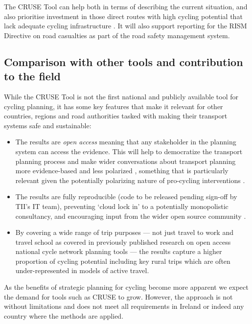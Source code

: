 \documentclass[
  super,
  preprint,
  3p]{elsarticle}
\providecommand{\tightlist}{%
  \setlength{\itemsep}{0pt}\setlength{\parskip}{0pt}}\usepackage{longtable,booktabs,array}
\begin{document}
The CRUSE Tool can help both in terms of describing the current
situation, and also prioritise investment in those direct routes with
high cycling potential that lack adequate cycling infrastructure
\citep{caulfield2012}. It will also support reporting for the RISM
Directive on road casualties as part of the road safety management
system.

\subsection{Comparison with other tools and contribution to the
field}\label{comparison-with-other-tools-and-contribution-to-the-field}

While the CRUSE Tool is not the first national and publicly available
tool for cycling planning, it has some key features that make it
relevant for other countries, regions and road authorities tasked with
making their transport systems safe and sustainable:

\begin{itemize}
\tightlist
\item
  The results are \emph{open access} meaning that any stakeholder in the
  planning system can access the evidence. This will help to democratize
  the transport planning process and make wider conversations about
  transport planning more evidence-based and less polarized
  \citep{lovelace2020}, something that is particularly relevant given
  the potentially polarizing nature of pro-cycling interventions
  \citep{wild2017}.
\item
  The results are fully reproducible (code to be released pending
  sign-off by TII's IT team), preventing `cloud lock in' to a
  potentially monopolistic consultancy, and encouraging input from the
  wider open source community \citep{lovelace2021, dhir2017}.
\item
  By covering a wide range of trip purposes --- not just travel to work
  \citep{lovelace2017, heinen2010} and travel school \citep{goodman2019}
  as covered in previously published research on open access national
  cycle network planning tools --- the results capture a higher
  proportion of cycling potential including key rural trips which are
  often under-represented in models of active travel.
\end{itemize}

As the benefits of strategic planning for cycling become more apparent
\citep{scappini2022} we expect the demand for tools such as CRUSE to
grow. However, the approach is not without limitations and does not meet
all requirements in Ireland or indeed any country where the methods are
applied.
\end{document}
